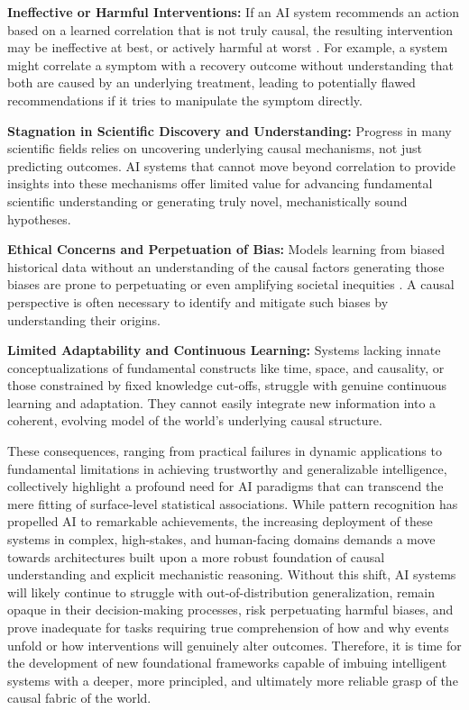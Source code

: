     \textbf{Ineffective or Harmful Interventions:} If an AI system recommends an action based on a learned correlation that is not truly causal, the resulting intervention may be ineffective at best, or actively harmful at worst \cite{Bareinboim2012causal, Peters2017Elements}. For example, a system might correlate a symptom with a recovery outcome without understanding that both are caused by an underlying treatment, leading to potentially flawed recommendations if it tries to manipulate the symptom directly.

     \textbf{Stagnation in Scientific Discovery and Understanding:} Progress in many scientific fields relies on uncovering underlying causal mechanisms, not just predicting outcomes. AI systems that cannot move beyond correlation to provide insights into these mechanisms offer limited value for advancing fundamental scientific understanding or generating truly novel, mechanistically sound hypotheses.

     \textbf{Ethical Concerns and Perpetuation of Bias:} Models learning from biased historical data without an understanding of the causal factors generating those biases are prone to perpetuating or even amplifying societal inequities \cite{Moraffah2020Causal}. A causal perspective is often necessary to identify and mitigate such biases by understanding their origins.

    \textbf{Limited Adaptability and Continuous Learning:} Systems lacking innate conceptualizations of fundamental constructs like time, space, and causality, or those constrained by fixed knowledge cut-offs, struggle with genuine continuous learning and adaptation. They cannot easily integrate new information into a coherent, evolving model of the world's underlying causal structure.

These consequences, ranging from practical failures in dynamic applications to fundamental limitations in achieving trustworthy and generalizable intelligence, collectively highlight a profound need for AI paradigms that can transcend the mere fitting of surface-level statistical associations. While pattern recognition has propelled AI to remarkable achievements, the increasing deployment of these systems in complex, high-stakes, and human-facing domains demands a move towards architectures built upon a more robust foundation of causal understanding and explicit mechanistic reasoning. Without this shift, AI systems will likely continue to struggle with out-of-distribution generalization, remain opaque in their decision-making processes, risk perpetuating harmful biases, and prove inadequate for tasks requiring true comprehension of how and why events unfold or how interventions will genuinely alter outcomes. Therefore, it is time for the development of new foundational frameworks capable of imbuing intelligent systems with a deeper, more principled, and ultimately more reliable grasp of the causal fabric of the world.

